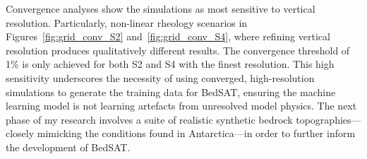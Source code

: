 Convergence analyses show the simulations as most sensitive to vertical resolution. Particularly, non-linear rheology scenarios in Figures~\ref{fig:grid_conv_S2} and~\ref{fig:grid_conv_S4}, where refining vertical resolution produces qualitatively different results. The convergence threshold of 1\% is only achieved for both S2 and S4 with the finest resolution. This high sensitivity underscores the necessity of using converged, high-resolution simulations to generate the training data for BedSAT, ensuring the machine learning model is not learning artefacts from unresolved model physics.
The next phase of my research involves a suite of realistic synthetic bedrock topographies—closely mimicking the conditions found in Antarctica—in order to further inform the development of BedSAT.